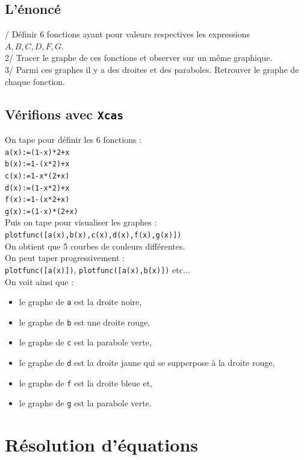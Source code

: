 \documentclass[a4paper,11pt]{book}
\begin{document}
\subsection{L'\'enonc\'e}
/ D\'efinir 6 fonctions ayant pour valeurs respectives les expressions 
$A,B,C,D,F,G$.\\
2/ Tracer le graphe de ces fonctions et observer sur un m\^eme graphique.\\
3/ Parmi ces graphes il y a des droites et des paraboles. Retrouver le graphe
de chaque fonction. 
\subsection{V\'erifions avec {\tt Xcas}}
On tape pour d\'efinir les 6 fonctions :\\
{\tt a(x):=(1-x)*2+x}\\
{\tt b(x):=1-(x*2)+x}\\
{\tt c(x):=1-x*(2+x)}\\
{\tt d(x):=(1-x*2)+x}\\
{\tt f(x):=1-(x*2+x)}\\
{\tt g(x):=(1-x)*(2+x)}\\
Puis on tape pour visualiser les graphes :\\
{\tt plotfunc([a(x),b(x),c(x),d(x),f(x),g(x)])}\\
On obtient que 5 courbes de couleurs diff\'erentes.\\
On peut taper progressivement :\\
{\tt plotfunc([a(x)])}, {\tt plotfunc([a(x),b(x)])} etc...\\
On voit ainsi que :
\begin{itemize}
\item le graphe de {\tt a} est la droite noire,
\item le graphe de {\tt b} est une droite rouge,
\item le graphe de {\tt c} est la parabole verte,
\item le graphe de {\tt d} est la droite jaune qui se supperpose \`a la droite rouge,
\item le graphe de {\tt f} est la  droite bleue et,
\item le graphe de {\tt g} est la parabole verte. 
\end{itemize}
\section{R\'esolution d'\'equations}
\end{document}
